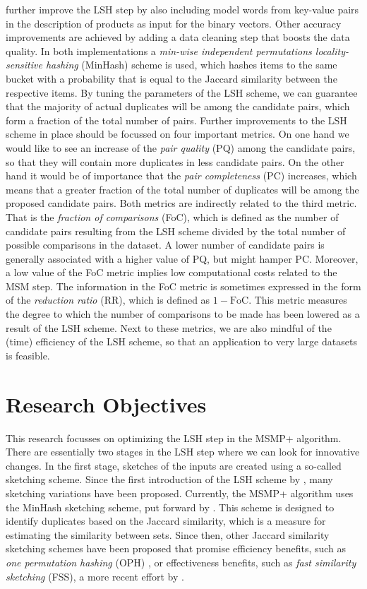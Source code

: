 \cite{HartveldKMNPFS18} further improve the LSH step by also including model words from key-value pairs in the description of products as input for the binary vectors. Other accuracy improvements are achieved by adding a data cleaning step that boosts the data quality. In both implementations a \textit{min-wise independent permutations locality-sensitive hashing} (MinHash) scheme is used, which hashes items to the same bucket with a probability that is equal to the Jaccard similarity between the respective items. By tuning the parameters of the LSH scheme, we can guarantee that the majority of actual duplicates will be among the candidate pairs, which form a fraction of the total number of pairs. Further improvements to the LSH scheme in place should be focussed on four important metrics. On one hand we would like to see an increase of the \textit{pair quality} (PQ) among the candidate pairs, so that they will contain more duplicates in less candidate pairs. On the other hand it would be of importance that the \textit{pair completeness} (PC) increases, which means that a greater fraction of the total number of duplicates will be among the proposed candidate pairs. Both metrics are indirectly related to the third metric. That is the \textit{fraction of comparisons} (FoC), which is defined as the number of candidate pairs resulting from the LSH scheme divided by the total number of possible comparisons in the dataset. A lower number of candidate pairs is generally associated with a higher value of PQ, but might hamper PC. Moreover, a low value of the FoC metric implies low computational costs related to the MSM step. The information in the FoC metric is sometimes expressed in the form of the \textit{reduction ratio} (RR), which is defined as $1 - \text{FoC}$. This metric measures the degree to which the number of comparisons to be made has been lowered as a result of the LSH scheme. Next to these metrics, we are also mindful of the (time) efficiency of the LSH scheme, so that an application to very large datasets is feasible.
\section{Research Objectives}
\label{sect:research_objectives}

This research focusses on optimizing the LSH step in the MSMP+ algorithm. There are essentially two stages in the LSH step where we can look for innovative changes. In the first stage, sketches of the inputs are created using a so-called sketching scheme. Since the first introduction of the LSH scheme by \cite{IndykM98}, many sketching variations have been proposed. Currently, the MSMP+ algorithm uses the MinHash sketching scheme, put forward by \cite{Broder00}. This scheme is designed to identify duplicates based on the Jaccard similarity, which is a  measure for estimating the similarity between sets. Since then, other Jaccard similarity sketching schemes have been proposed that promise efficiency benefits, such as \textit{one permutation hashing} (OPH) \citep{Ping2012}, or effectiveness benefits, such as \textit{fast similarity sketching} (FSS), a more recent effort by \cite{DahlgaardKT17}.  

